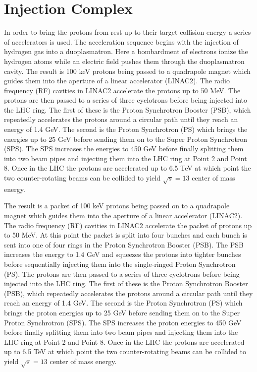 \section{Injection Complex}
In order to bring the protons from rest up to their target collision energy a series of accelerators is used.  The acceleration sequence begins with the injection of hydrogen gas into a duoplasmatron.  Here a bombardment of electrons ionize the hydrogen atoms while an electric field pushes them through the duoplasmatron cavity. The result is 100 keV protons being passed to a quadrapole magnet which guides them into the aperture of a linear accelerator (LINAC2).  The radio frequency (RF) cavities in LINAC2 accelerate the protons up to 50 MeV. The protons are then passed to a series of three cyclotrons before being injected into the LHC ring.  The first of these is the Proton Synchrotron Booster (PSB), which repeatedly accelerates the protons around a circular path until they reach an energy of 1.4 GeV.  The second is the Proton Synchrotron (PS) which brings the energies up to 25 GeV before sending them on to the Super Proton Synchrotron (SPS).  The SPS increases the energies to 450 GeV before finally splitting them into two beam pipes and injecting them into the LHC ring at Point 2 and Point 8.  Once in the LHC the protons are accelerated up to 6.5 TeV at which point the two counter-rotating beams can be collided to yield $\sqrt{s}=13$ center of mass energy.

The result is a packet of 100 keV protons being passed on to a quadrapole magnet which guides them into the aperture of a linear accelerator (LINAC2).  The radio frequency (RF) cavities in LINAC2 accelerate the packet of protons up to 50 MeV.  At this point the packet is split into four bunches and each bunch is sent into one of four rings in the Proton Synchrotron Booster (PSB).  The PSB increases the energy to 1.4 GeV and squeezes the protons into tighter bunches before sequentially injecting them into the single-ringed Proton Synchrotron (PS).  The protons are then passed to a series of three cyclotrons before being injected into the LHC ring.  The first of these is the Proton Synchrotron Booster (PSB), which repeatedly accelerates the protons around a circular path until they reach an energy of 1.4 GeV.  The second is the Proton Synchrotron (PS) which brings the proton energies up to 25 GeV before sending them on to the Super Proton Synchrotron (SPS).  The SPS increases the proton energies to 450 GeV before finally splitting them into two beam pipes and injecting them into the LHC ring at Point 2 and Point 8.  Once in the LHC the protons are accelerated up to 6.5 TeV at which point the two counter-rotating beams can be collided to yield $\sqrt{s}=13$ center of mass energy.

